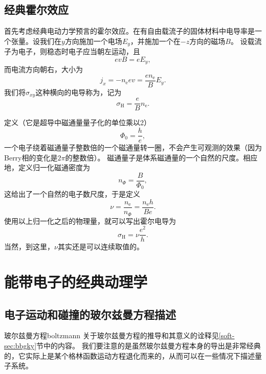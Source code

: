 \subsection{经典霍尔效应}\label{sec:classical-hall-effect}

首先考虑经典电动力学预言的霍尔效应。在有自由载流子的固体材料中电导率是一个张量。设我们在$y$方向施加一个电场$E_y$，并施加一个在$-z$方向的磁场$B$。
设载流子为电子，则稳态时电子应当朝左运动，且
\[
    e v B = e E_y,
\]
而电流方向朝右，大小为
\[
    j_x = - n_\text{e} e v = \frac{e n_\text{e}}{B} E_y.
\]
我们将$\sigma_{xy}$这种横向的电导称为，记为
\begin{equation}
    \sigma_\text{H} = \frac{e}{B} n_\text{e}.
\end{equation}

定义（它是超导中磁通量量子化的单位乘以2）
\begin{equation}
    \Phi_0 = \frac{h}{e},
\end{equation}
一个电子绕着磁通量子整数倍的一个磁通量转一圈，不会产生可观测的效果（因为Berry相的变化是$2\pi$的整数倍）。
磁通量子是体系磁通量的一个自然的尺度。相应地，定义归一化磁通密度为
\begin{equation}
    n_{\Phi} = \frac{B}{\Phi_0},
\end{equation}
这给出了一个自然的电子数尺度，于是定义
\begin{equation}
    \nu = \frac{n_\text{e}}{n_\Phi} = \frac{n_\text{e} h}{B e}.
\end{equation}
使用以上归一化之后的物理量，就可以写出霍尔电导为
\begin{equation}
    \sigma_\text{H} = \nu \frac{e^2}{h}.
    \label{eq:classical-hall-conductivity}
\end{equation}
当然，到这里，$\nu$其实还是可以连续取值的。

\section{能带电子的经典动理学}

\subsection{电子运动和碰撞的玻尔兹曼方程描述}

\begin{back}{玻尔兹曼方程}{boltzmann}
    关于玻尔兹曼方程的推导和其意义的诠释见\ref{soft-sec:bbgky}节中的内容。
    我们要注意的是虽然玻尔兹曼方程本身的导出是非常经典的，它实际上是某个格林函数运动方程退化而来的，从而可以在一些情况下描述量子系统。
\end{back}


